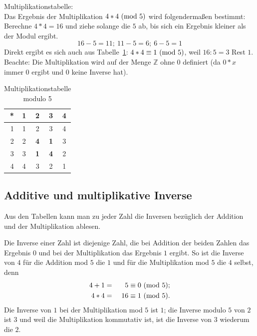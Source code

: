 \begin{refsegment}
\begin{example}{ Multiplikationstabelle:}\\
Das Ergebnis der Multiplikation $4 * 4 {\rm ~(mod~ } 5)$ wird folgendermaßen
bestimmt: Berechne $ 4*4=16$ und ziehe solange die $5$ ab, bis sich ein
Ergebnis kleiner als der Modul ergibt.
$$16 - 5 = 11;~ 11 - 5 = 6;~6- 5 = 1$$
Direkt ergibt es sich auch aus Tabelle~\ref{mulmod5}: $4 * 4 \equiv
1 {\rm ~(mod~} 5)$, weil $16 : 5 = 3$ Rest $1$.\\
Beachte: Die Multiplikation wird auf der Menge $\mathbb{Z}$ ohne $0$ definiert
(da $0*x$ immer $0$ ergibt und $0$ keine Inverse hat).

\begin{table}[ht]
\begin{center}
\begin{tabular}{r|cccc}
* & 1& 2 & 3 & 4\\
\hline
1 & 1 &    2    &    3    & 4\\
2 & 2 & \textbf{4} & \textbf{1} & 3\\
3 & 3 & \textbf{1} & \textbf{4} & 2\\
4 & 4 &    3    &    2    & 1
\end{tabular}
\end{center}
\caption{Multiplikationstabelle modulo 5}
\label{mulmod5}
\end{table}
\end{example}


\subsection{Additive und multiplikative Inverse}
\label{add-and-mult-inverses}\label{multmodn}
 

Aus den Tabellen kann man zu jeder Zahl die Inversen bezüglich der Addition
und der Multiplikation ablesen.

Die Inverse einer Zahl ist diejenige Zahl, die bei Addition der beiden
Zahlen das Ergebnis $0$ und bei der Multiplikation das Ergebnis $1$ ergibt. So
ist die Inverse von $4$ für die Addition mod $5$ die $1$ und für die
Multiplikation mod $5$ die $4$ selbst, denn
\begin{alignat}{2}
4 + 1 &  =  & 5 & \equiv 0 {\rm ~(mod~ } 5); \nonumber\\
4 * 4 &  = & ~16 & \equiv 1 {\rm ~(mod~ } 5). \nonumber
\end{alignat}
Die Inverse von $1$ bei der Multiplikation mod $5$ ist $1$; die Inverse modulo $5$
von $2$ ist $3$ und weil die Multiplikation kommutativ ist, ist die Inverse von
$3$ wiederum die $2$.


\end{refsegment}
